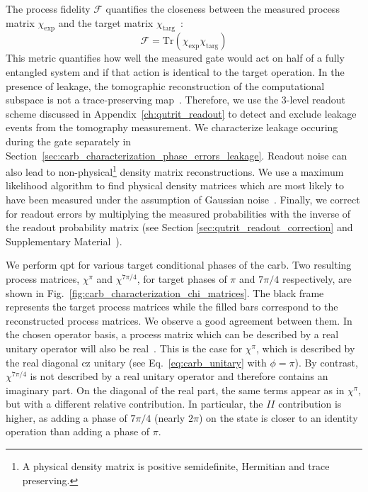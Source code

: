 The process fidelity $\mathcal{F}$ quantifies the closeness between the measured process matrix $\chi_\mathrm{exp}$ and the target matrix $\chi_\mathrm{targ}$~\cite{Schumacher1996SendingChannels}: 
 \begin{equation}
     \mathcal{F} = \mathrm{Tr}(\chi_\mathrm{exp} \chi_\mathrm{targ})
 \end{equation}
This metric quantifies how well the measured gate would act on half of a fully entangled system and if that action is identical to the target operation.
In the presence of leakage, the tomographic reconstruction of the computational subspace is not a trace-preserving map~\cite{Wood2018QuantificationErrors}. Therefore, we use the 3-level readout scheme discussed in Appendix~\ref{ch:qutrit_readout} to detect and exclude leakage events from the tomography measurement. We characterize leakage occuring during the gate separately in Section~\ref{sec:carb_characterization_phase_errors_leakage}. 
Readout noise can also lead to non-physical\footnote{A physical density matrix is positive semidefinite, Hermitian and trace preserving.} density matrix reconstructions. We use a maximum likelihood algorithm to find physical density matrices which are most likely to have been measured under the assumption of Gaussian noise~\cite{BaurRealizingQubits}. 
Finally, we correct for readout errors by multiplying the measured probabilities with the inverse of the readout probability matrix (see Section \ref{sec:qutrit_readout_correction} and Supplementary Material~\cite[suppl.~mat.]{Bialczak2010QuantumQubits}).

We perform \gls{qpt} for various target conditional phases of the \gls{carb}. Two resulting process matrices, $\chi^\pi$ and $\chi^{7\pi/4}$,  for target phases of $\pi$ and $7\pi/4$ respectively, are shown in Fig.~\ref{fig:carb_characterization_chi_matrices}. The black frame represents the target process matrices while the filled bars correspond to the reconstructed process matrices. We observe a good  agreement between them. In the chosen operator basis, a process matrix which can be described by a real unitary operator will also be real~\cite{Nielsen2000QuantumInformation}. This is the case for $\chi^\pi$, which is described by the real diagonal \gls{cz} unitary (see Eq.~\eqref{eq:carb_unitary} with $\phi = \pi$). By contrast, $\chi^{7\pi/4}$ is not described by a real unitary operator and therefore contains an imaginary part. On the diagonal of the real part, the same terms appear as in $\chi^{\pi}$, but with a different relative contribution. In particular, the $II$ contribution is higher, as adding a phase of $7\pi/4$ (nearly $2\pi$) on the \oo{} state is closer to an identity operation than adding a phase of $\pi$.

